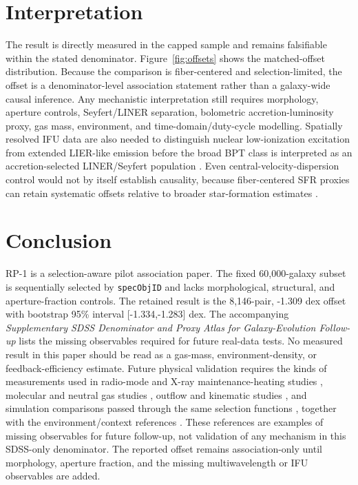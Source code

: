 \documentclass[twocolumn]{aastex631}
\begin{document}
\section{Interpretation}
The result is directly measured in the capped sample and remains falsifiable within the stated denominator. Figure~\ref{fig:offsets} shows the matched-offset distribution. Because the comparison is fiber-centered and selection-limited, the offset is a denominator-level association statement rather than a galaxy-wide causal inference. Any mechanistic interpretation still requires morphology, aperture controls, Seyfert/LINER separation, bolometric accretion-luminosity proxy, gas mass, environment, and time-domain/duty-cycle modelling. Spatially resolved IFU data are also needed to distinguish nuclear low-ionization excitation from extended LIER-like emission before the broad BPT class is interpreted as an accretion-selected LINER/Seyfert population \citep{belfiore2016}. Even central-velocity-dispersion control would not by itself establish causality, because fiber-centered SFR proxies can retain systematic offsets relative to broader star-formation estimates \citep{salim2012}.

\section{Conclusion}
RP-1 is a selection-aware pilot association paper. The fixed 60,000-galaxy subset is sequentially selected by \texttt{specObjID} and lacks morphological, structural, and aperture-fraction controls. The retained result is the 8,146-pair, -1.309 dex offset with bootstrap 95\% interval [-1.334,-1.283] dex. The accompanying \emph{Supplementary SDSS Denominator and Proxy Atlas for Galaxy-Evolution Follow-up} lists the missing observables required for future real-data tests. No measured result in this paper should be read as a gas-mass, environment-density, or feedback-efficiency estimate.
Future physical validation requires the kinds of measurements used in radio-mode and X-ray maintenance-heating studies \citep{best2005,fabian2012,mcnamara2007,heckmanbest2014,lamassa2013}, molecular and neutral gas studies \citep{xcoldgass2017,xgass2018}, outflow and kinematic studies \citep{veilleux2005,cicone2014,carniani2017,fiore2017}, and simulation comparisons passed through the same selection functions \citep{simba2019,tng2019,eagle2015}, together with the environment/context references \citep{peng2010,ellison2011,piotrowska2022,wetzel2013,dekel2006}. These references are examples of missing observables for future follow-up, not validation of any mechanism in this SDSS-only denominator. The reported offset remains association-only until morphology, aperture fraction, and the missing multiwavelength or IFU observables are added.
\end{document}
